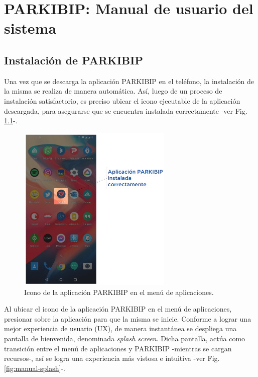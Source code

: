 \chapter{PARKIBIP: Manual de usuario del sistema}

\section{Instalación de PARKIBIP}

Una vez que se descarga la aplicación PARKIBIP en el teléfono, la instalación de la misma se realiza de manera automática. Así, luego de un proceso de instalación satisfactorio, es preciso ubicar el icono ejecutable de la aplicación descargada, para asegurarse que se encuentra instalada correctamente -ver Fig. \ref{fig:instalation-parkibip}-. 

\begin{figure}[H]
 \centering
 \includegraphics[height=8cm]{TESIS/imagenes/user-manual/manual-instalation.PNG}
 \caption{Icono de la aplicación PARKIBIP en el menú de aplicaciones.}
 \label{fig:instalation-parkibip}
\end{figure}

Al ubicar el icono de la aplicación PARKIBIP en el menú de aplicaciones, presionar sobre la aplicación para que la misma se inicie. Conforme a lograr una mejor experiencia de usuario (UX), de manera instantánea se despliega una pantalla de bienvenida, denominada \textit{splash screen}. Dicha pantalla, actúa como transición entre el menú de aplicaciones y PARKIBIP -mientras se cargan recursos-, así se logra una experiencia más vistosa e intuitiva -ver Fig. \ref{fig:manual-splash}-. 

